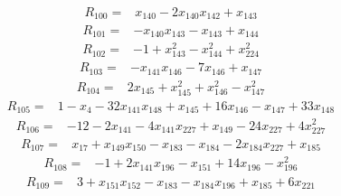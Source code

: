 \begin{equation*}\begin{split}
R_{100}={}&x_{140} - 2x_{140} x_{142} + x_{143}
\end{split}\end{equation*}
\begin{equation*}\begin{split}
R_{101}={}&-x_{140} x_{143} - x_{143} + x_{144}
\end{split}\end{equation*}
\begin{equation*}\begin{split}
R_{102}={}&-1 + x_{143}^{2} - x_{144}^{2} + x_{224}^{2}
\end{split}\end{equation*}
\begin{equation*}\begin{split}
R_{103}={}&-x_{141} x_{146} - 7x_{146} + x_{147}
\end{split}\end{equation*}
\begin{equation*}\begin{split}
R_{104}={}&2x_{145} + x_{145}^{2} + x_{146}^{2} - x_{147}^{2}
\end{split}\end{equation*}
\begin{equation*}\begin{split}
R_{105}={}&1 - x_{4} - 32x_{141} x_{148} + x_{145} + 16x_{146} - x_{147} + 33x_{148}
\end{split}\end{equation*}
\begin{equation*}\begin{split}
R_{106}={}&-12 - 2x_{141} - 4x_{141} x_{227} + x_{149} - 24x_{227} + 4x_{227}^{2}
\end{split}\end{equation*}
\begin{equation*}\begin{split}
R_{107}={}&x_{17} + x_{149} x_{150} - x_{183} - x_{184} - 2x_{184} x_{227} + x_{185}
\end{split}\end{equation*}
\begin{equation*}\begin{split}
R_{108}={}&-1 + 2x_{141} x_{196} - x_{151} + 14x_{196} - x_{196}^{2}
\end{split}\end{equation*}
\begin{equation*}\begin{split}
R_{109}={}&3 + x_{151} x_{152} - x_{183} - x_{184} x_{196} + x_{185} + 6x_{221}
\end{split}\end{equation*}
